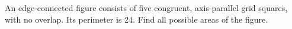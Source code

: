 An edge-connected figure consists of five congruent, axis-parallel grid squares, with no overlap. Its perimeter is 24. Find all possible areas of the figure.
